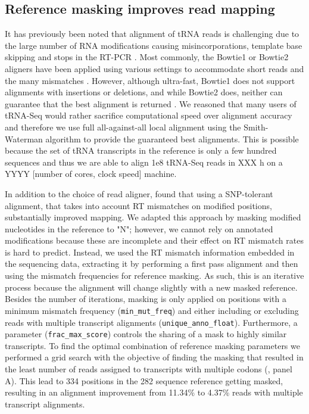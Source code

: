 \documentclass[9pt,lineno]{elife}
\begin{document}
\subsection{Reference masking improves read mapping}
It has previously been noted that alignment of tRNA reads is challenging due to the large number of RNA modifications causing misincorporations, template base skipping and stops in the RT-PCR \citep{Hoffmann2018-uz, Behrens2021-gb}.
Most commonly, the Bowtie1 or Bowtie2 aligners have been applied using various settings to accommodate short reads and the many mismatches \citep{Cozen2015-cx, Zheng2015-kj, Clark2016-ph, Evans2017-st, Pinkard2020-yd}.
However, although ultra-fast, Bowtie1 does not support alignments with insertions or deletions, and while Bowtie2 does, neither can guarantee that the best alignment is returned \citep{Langmead2009-yx, Langmead2012-ui}.
We reasoned that many users of tRNA-Seq would rather sacrifice computational speed over alignment accuracy and therefore we use full all-against-all local alignment using the Smith-Waterman algorithm to provide the guaranteed best alignments.
This is possible because the set of tRNA transcripts in the reference is only a few hundred sequences and thus we are able to align 1e8 tRNA-Seq reads in XXX h on a YYYY [number of cores, clock speed] machine.

In addition to the choice of read aligner, \cite{Behrens2021-gb} found that using a SNP-tolerant alignment, that takes into account RT mismatches on modified positions, substantially improved mapping.
We adapted this approach by masking modified nucleotides in the reference to "N"; however, we cannot rely on annotated modifications because these are incomplete and their effect on RT mismatch rates is hard to predict.
Instead, we used the RT mismatch information embedded in the sequencing data, extracting it by performing a first pass alignment and then using the mismatch frequencies for reference masking.
As such, this is an iterative process because the alignment will change slightly with a new masked reference.
Besides the number of iterations, masking is only applied on positions with a minimum mismatch frequency (\verb|min_mut_freq|) and either including or excluding reads with multiple transcript alignments (\verb|unique_anno_float|).
Furthermore, a parameter (\verb|frac_max_score|) controls the sharing of a mask to  highly similar transcripts.
To find the optimal combination of reference masking parameters we performed a grid search with the objective of finding the masking that resulted in the least number of reads assigned to transcripts with multiple codons (, panel A).
This lead to 334 positions in the 282 sequence reference getting masked, resulting in an alignment improvement from 11.34\% to 4.37\% reads with multiple transcript alignments.
\end{document}
